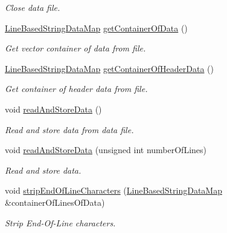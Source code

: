 \begin{DoxyCompactItemize}
\begin{DoxyCompactList}\small\item\em Close data file. \end{DoxyCompactList}\item 
\hyperlink{classtudat_1_1input__output_1_1TwoLineElementsTextFileReader_ae6d9157e1d7836a8134b99a19585c8bd}{Line\+Based\+String\+Data\+Map} \hyperlink{classtudat_1_1input__output_1_1TwoLineElementsTextFileReader_a7260455cc7aeb0933212b4fe1174ca97}{get\+Container\+Of\+Data} ()
\begin{DoxyCompactList}\small\item\em Get vector container of data from file. \end{DoxyCompactList}\item 
\hyperlink{classtudat_1_1input__output_1_1TwoLineElementsTextFileReader_ae6d9157e1d7836a8134b99a19585c8bd}{Line\+Based\+String\+Data\+Map} \hyperlink{classtudat_1_1input__output_1_1TwoLineElementsTextFileReader_a0277bea26eb08fe3d5c1d9fa004c33b5}{get\+Container\+Of\+Header\+Data} ()
\begin{DoxyCompactList}\small\item\em Get container of header data from file. \end{DoxyCompactList}\item 
void \hyperlink{classtudat_1_1input__output_1_1TwoLineElementsTextFileReader_aafecf8e6c69384a6def4a7b29b0f42c2}{read\+And\+Store\+Data} ()
\begin{DoxyCompactList}\small\item\em Read and store data from data file. \end{DoxyCompactList}\item 
void \hyperlink{classtudat_1_1input__output_1_1TwoLineElementsTextFileReader_af88317f9183f19d01e583c6233756d35}{read\+And\+Store\+Data} (unsigned int number\+Of\+Lines)
\begin{DoxyCompactList}\small\item\em Read and store data. \end{DoxyCompactList}\item 
void \hyperlink{classtudat_1_1input__output_1_1TwoLineElementsTextFileReader_a3145de9f3b1e5a01807acde65108ab24}{strip\+End\+Of\+Line\+Characters} (\hyperlink{classtudat_1_1input__output_1_1TwoLineElementsTextFileReader_ae6d9157e1d7836a8134b99a19585c8bd}{Line\+Based\+String\+Data\+Map} \&container\+Of\+Lines\+Of\+Data)
\begin{DoxyCompactList}\small\item\em Strip End-\/\+Of-\/\+Line characters. \end{DoxyCompactList}\item 

\end{DoxyCompactItemize}
